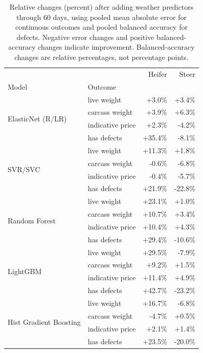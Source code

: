 \begin{table}
\caption{Relative changes (percent) after adding weather predictors through 60 days, using pooled mean absolute error for continuous outcomes and pooled balanced accuracy for defects. Negative error changes and positive balanced-accuracy changes indicate improvement. Balanced-accuracy changes are relative percentages, not percentage points.}
\label{tab:beef:ablation_mean}
\begin{tabular}{llrr}
\toprule
 &  & Heifer & Steer \\
Model & Outcome &  &  \\
\midrule
\multirow[t]{4}{*}{ElasticNet (R/LR)} & live weight & +3.0\% & +3.4\% \\
 & carcass weight & +3.9\% & +6.3\% \\
 & indicative price & +2.3\% & -4.2\% \\
 & has defects & +35.4\% & -8.1\% \\
\cline{1-4}
\multirow[t]{4}{*}{SVR/SVC} & live weight & +11.3\% & +1.8\% \\
 & carcass weight & -0.6\% & -6.8\% \\
 & indicative price & -0.4\% & -5.7\% \\
 & has defects & +21.9\% & -22.8\% \\
\cline{1-4}
\multirow[t]{4}{*}{Random Forest} & live weight & +23.1\% & +1.0\% \\
 & carcass weight & +10.7\% & +3.4\% \\
 & indicative price & +10.4\% & +4.3\% \\
 & has defects & +29.4\% & -10.6\% \\
\cline{1-4}
\multirow[t]{4}{*}{LightGBM} & live weight & +29.5\% & -7.9\% \\
 & carcass weight & +9.2\% & +1.5\% \\
 & indicative price & +11.4\% & +4.9\% \\
 & has defects & +42.7\% & -23.2\% \\
\cline{1-4}
\multirow[t]{4}{*}{Hist Gradient Boosting} & live weight & +16.7\% & -6.8\% \\
 & carcass weight & -4.7\% & +0.5\% \\
 & indicative price & +2.1\% & +1.4\% \\
 & has defects & +23.5\% & -20.0\% \\
\cline{1-4}
\bottomrule
\end{tabular}
\end{table}
